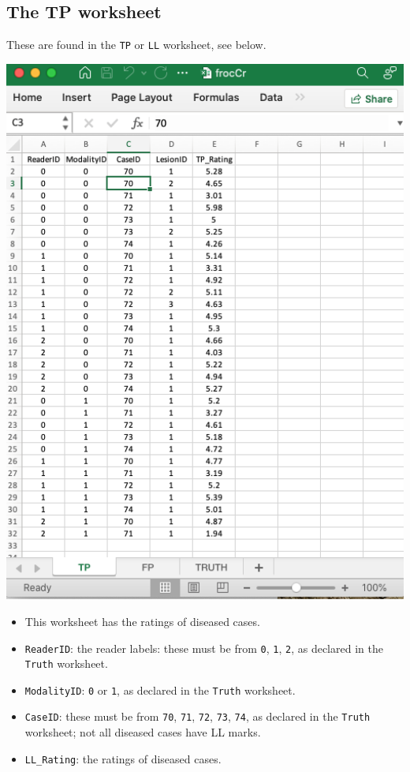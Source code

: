 \documentclass[
]{book}
\providecommand{\tightlist}{%
  \setlength{\itemsep}{0pt}\setlength{\parskip}{0pt}}
\begin{document}
\hypertarget{the-tp-worksheet}{%
\subsection{The TP worksheet}\label{the-tp-worksheet}}

These are found in the \texttt{TP} or \texttt{LL} worksheet, see below.

\includegraphics[width=1\textwidth,height=\textheight]{images/software-details/frocCrTp.png}

\begin{itemize}
\tightlist
\item
  This worksheet has the ratings of diseased cases.
\item
  \texttt{ReaderID}: the reader labels: these must be from \texttt{0}, \texttt{1}, \texttt{2}, as declared in the \texttt{Truth} worksheet.
\item
  \texttt{ModalityID}: \texttt{0} or \texttt{1}, as declared in the \texttt{Truth} worksheet.
\item
  \texttt{CaseID}: these must be from \texttt{70}, \texttt{71}, \texttt{72}, \texttt{73}, \texttt{74}, as declared in the \texttt{Truth} worksheet; not all diseased cases have LL marks.\\
\item
  \texttt{LL\_Rating}: the ratings of diseased cases.
\end{itemize}

  
\end{document}
